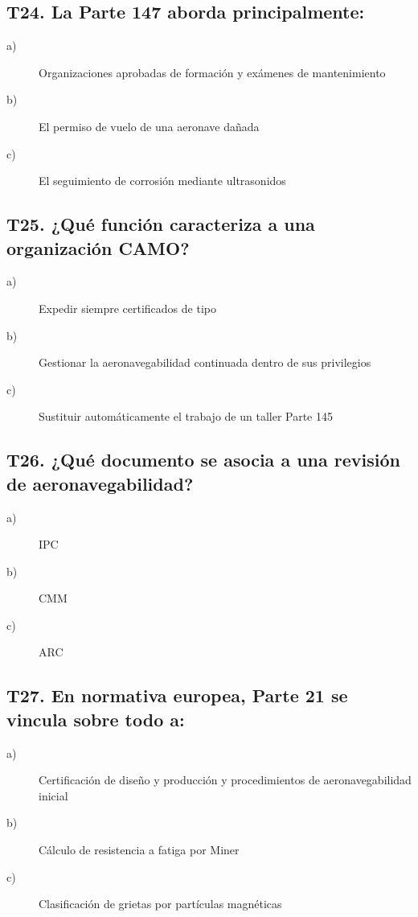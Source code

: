 \subsection*{T24. La Parte 147 aborda principalmente:}
\begin{description}
\item[a)] Organizaciones aprobadas de formación y exámenes de mantenimiento
\item[b)] El permiso de vuelo de una aeronave dañada
\item[c)] El seguimiento de corrosión mediante ultrasonidos
\end{description}

\subsection*{T25. ¿Qué función caracteriza a una organización CAMO?}
\begin{description}
\item[a)] Expedir siempre certificados de tipo
\item[b)] Gestionar la aeronavegabilidad continuada dentro de sus privilegios
\item[c)] Sustituir automáticamente el trabajo de un taller Parte 145
\end{description}

\subsection*{T26. ¿Qué documento se asocia a una revisión de aeronavegabilidad?}
\begin{description}
\item[a)] IPC
\item[b)] CMM
\item[c)] ARC
\end{description}

\subsection*{T27. En normativa europea, Parte 21 se vincula sobre todo a:}
\begin{description}
\item[a)] Certificación de diseño y producción y procedimientos de aeronavegabilidad inicial
\item[b)] Cálculo de resistencia a fatiga por Miner
\item[c)] Clasificación de grietas por partículas magnéticas
\end{description}

